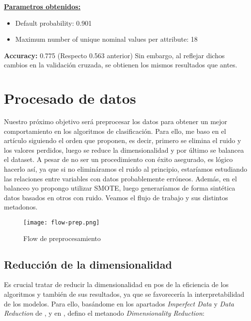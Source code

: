 \underline{\textbf{Parametros obtenidos:}} \\
\begin{itemize}
	\item Default probability: 0.901
	\item Maximum number of unique nominal values per attribute: 18
\end{itemize}

\textbf{Accuracy:} 0.775 (Respecto 0.563 anterior)
Sin embargo, al reflejar dichos cambios en la validación cruzada, se obtienen los mismos resultados que antes.



\section{Procesado de datos}

Nuestro próximo objetivo será preprocesar los datos para obtener un mejor comportamiento en los algoritmos de clasificación. Para ello,  me baso en el artículo \cite{preprocessing} siguiendo el orden que proponen, es decir, primero se elimina el ruido y los valores perdidos, luego se reduce la dimensionalidad y por último se balancea el dataset. A pesar de no ser un procedimiento con éxito asegurado, es lógico hacerlo así, ya que si no elimináramos el ruido al principio, estaríamos estudiando las relaciones entre variables con datos probablemente erróneos. Además, en el balanceo yo propongo utilizar SMOTE, luego generaríamos de forma sintética datos basados en otros con ruido. Veamos el flujo de trabajo y sus distintos metadonos.

\begin{figure}[H] %
	\centering
	\texttt{[image: flow-prep.png]}  %
	\caption{Flow de preprocesamiento} 
	\label{fig:flow-prep}
\end{figure}


\subsection{Reducción de la dimensionalidad}

Es crucial tratar de reducir la dimensionalidad en pos de la eficiencia de los algoritmos y también de sus resultados, ya que se favorecería la interpretabilidad de los modelos. Para ello, basándome en los apartados \textit{Imperfect Data} y \textit{Data Reduction} de \cite{preprocessing}, \cite{dr2} y en \cite{dr}, defino el metanodo \textit{Dimensionality Reduction}:

